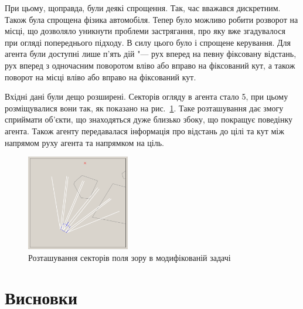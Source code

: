 \documentclass[a4paper,10pt,fleqn,draft]{article}
\begin{document}
При цьому, щоправда, були деякі спрощення. Так, час вважався дискретним. Також була спрощена фізика автомобіля. Тепер було можливо робити розворот на місці, що дозволяло уникнути проблеми застрягання, про яку вже згадувалося при огляді попереднього підходу. В силу цього було і спрощене керування. Для агента були доступні лише п'ять дій "--- рух вперед на певну фіксовану відстань, рух вперед з одночасним поворотом вліво або вправо на фіксований кут, а також поворот на місці вліво або вправо на фіксований кут. 

Вхідні дані були дещо розширені. Секторів огляду в агента стало 5, при цьому розміщувалися вони так, як показано на рис.~\ref{fig:tank-vis-area}. Таке розташування дає змогу сприймати об'єкти, що знаходяться дуже близько збоку, що покращує поведінку агента. Також агенту передавалася інформація про відстань до цілі та кут між напрямом руху агента та напрямком на ціль.
\begin{figure}
	\centering
	\includegraphics[width=0.4\textwidth]{tank-vis-area}
	\caption{Розташування секторів поля зору в модифікованій задачі}
	\label{fig:tank-vis-area}
\end{figure}

\section{Висновки}
\begin{thebibliography}{99}
\end{thebibliography}
\end{document}
